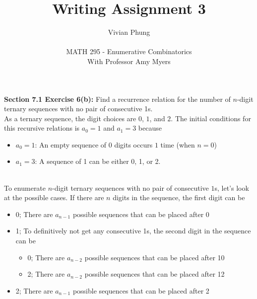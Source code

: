 \documentclass[12pt]{article}
\begin{document}
 
 
 
\title{Writing Assignment 3}%
\author{Vivian Phung\\ \\ %
MATH 295 - Enumerative Combinatorics\\With Professor Amy Myers} 

\maketitle
 

\textbf{Section 7.1 Exercise 6(b):} Find a recurrence relation for the number of $n$-digit ternary sequences with no pair of consecutive 1s. \\

As a ternary sequence, the digit choices are $0$, $1$, and $2$. The initial conditions for this recursive relations is $a_{0} = 1$ and $a_{1} = 3$ because
\begin{itemize}
  \item $a_{0} = 1$: An empty sequence of $0$ digits occurs $1$ time (when $n = 0$)
  \item $a_{1} = 3$: A sequence of 1 can be either 0, 1, or 2.
\end{itemize} \\

To enumerate $n$-digit ternary sequences with no pair of consecutive $1$s, let's look at the possible cases. If there are $n$ digits in the sequence, the first digit can be
\begin{itemize}
  \item 0; There are $a_{n-1}$ possible sequences that can be placed after 0
  \item 1; To definitively not get any consecutive 1s, the second digit in the sequence can be
  \begin{itemize}
      \item 0; There are $a_{n-2}$ possible sequences that can be placed after 10
      \item 2; There are $a_{n-2}$ possible sequences that can be placed after 12
    \end{itemize}
  \item 2; There are $a_{n-1}$ possible sequences that can be placed after 2
\end{itemize} \\
\end{document}
